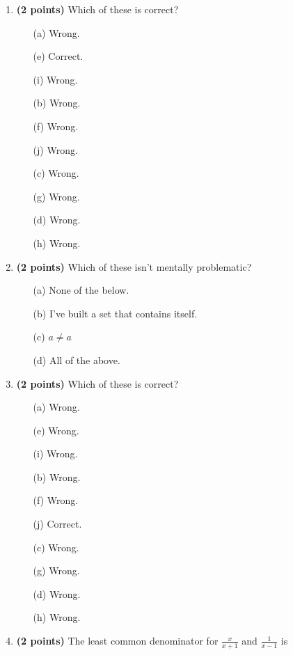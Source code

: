 \documentclass[12pt]{amsart}
\begin{document}
\newpage
\begin{enumerate}
\item {\bf (2 points)} 
 Which of these is correct?

\begin{minipage}[t]{1.0\linewidth}\begin{multicols}{4}\begin{itemize}\item[(a)]  Wrong. \item[(e)]  Correct. \item[(i)]  Wrong. \item[(b)]  Wrong. \item[(f)]  Wrong. \item[(j)]  Wrong. \item[(c)]  Wrong. \item[(g)]  Wrong. \item[] \item[(d)]  Wrong. \item[(h)]  Wrong. \item[] \end{itemize}\end{multicols}\end{minipage} \vfill 
\item {\bf (2 points)} 
 Which of these isn't mentally problematic?

\begin{minipage}[t]{1.0\linewidth}\begin{itemize}\item[(a)]  None of the below.  \item[(b)]  I've built a set that contains itself. \item[(c)]  $a \neq a$ \item[(d)]   All of the above. \end{itemize}\end{minipage} \vfill 
\item {\bf (2 points)} 
 Which of these is correct?

\begin{minipage}[t]{1.0\linewidth}\begin{multicols}{4}\begin{itemize}\item[(a)]  Wrong. \item[(e)]  Wrong. \item[(i)]  Wrong. \item[(b)]  Wrong. \item[(f)]  Wrong. \item[(j)]  Correct. \item[(c)]  Wrong. \item[(g)]  Wrong. \item[] \item[(d)]  Wrong. \item[(h)]  Wrong. \item[] \end{itemize}\end{multicols}\end{minipage} \vfill 
\item {\bf (2 points)} 
 The least common denominator for $\displaystyle \frac{x}{x+1}$ and $\displaystyle \frac{1}{x-1}$ is \vspace{.2cm}


\end{enumerate}
\end{document}
